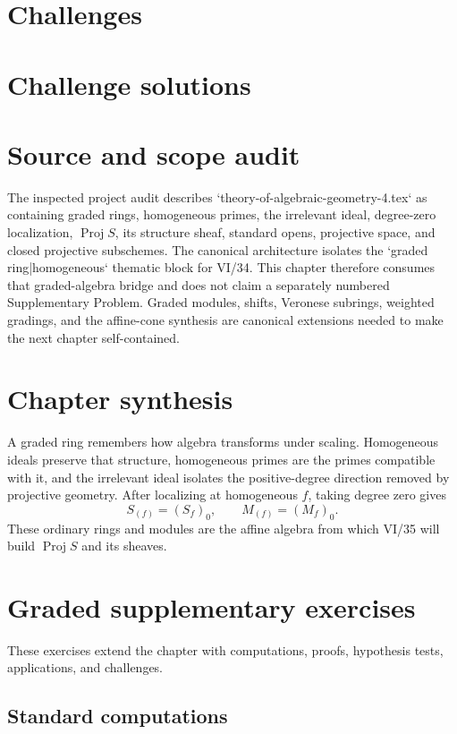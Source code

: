 \section{Challenges}


\ifdefined\IncludeChallengeSolutions
\section{Challenge solutions}

\fi

\section*{Source and scope audit}
The inspected project audit describes `theory-of-algebraic-geometry-4.tex` as containing graded rings, homogeneous primes, the irrelevant ideal, degree-zero localization, \(\operatorname{Proj}S\), its structure sheaf, standard opens, projective space, and closed projective subschemes. The canonical architecture isolates the `graded ring|homogeneous` thematic block for VI/34. This chapter therefore consumes that graded-algebra bridge and does not claim a separately numbered Supplementary Problem. Graded modules, shifts, Veronese subrings, weighted gradings, and the affine-cone synthesis are canonical extensions needed to make the next chapter self-contained.

\section*{Chapter synthesis}
A graded ring remembers how algebra transforms under scaling. Homogeneous ideals preserve that structure, homogeneous primes are the primes compatible with it, and the irrelevant ideal isolates the positive-degree direction removed by projective geometry. After localizing at homogeneous \(f\), taking degree zero gives
\[
S_{(f)}=(S_f)_0,\qquad M_{(f)}=(M_f)_0.
\]
These ordinary rings and modules are the affine algebra from which VI/35 will build \(\operatorname{Proj}S\) and its sheaves.
\section{Graded supplementary exercises}
These exercises extend the chapter with computations, proofs, hypothesis tests, applications, and challenges.

\subsection*{Standard computations}


